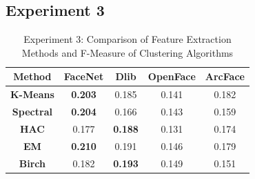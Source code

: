 \documentclass[12pt,english]{article}
\begin{document}
\subsection{Experiment 3}

\begin{table}[H]
\centering
\begin{tabular}{||c c c c c||} 
 \hline
Method & FaceNet & Dlib & OpenFace & ArcFace\\ [0.5ex]
 \hline\hline
 \textbf{K-Means} & \textbf{0.203} & 0.185 & 0.141 & 0.182\\ 
 \hline
  \textbf{Spectral} & \textbf{0.204} & 0.166 & 0.143 & 0.159\\
 \hline
 \textbf{HAC} & 0.177 & \textbf{0.188} & 0.131 & 0.174\\
 \hline
 \textbf{EM} & \textbf{0.210} & 0.191 & 0.146 & 0.179\\
 \hline
 \textbf{Birch} & 0.182 & \textbf{0.193} & 0.149 & 0.151\\
 \hline
\end{tabular}
\caption{Experiment 3: Comparison of Feature Extraction Methods and F-Measure of Clustering Algorithms}
\label{table:ex3}
\end{table}
\end{document}
